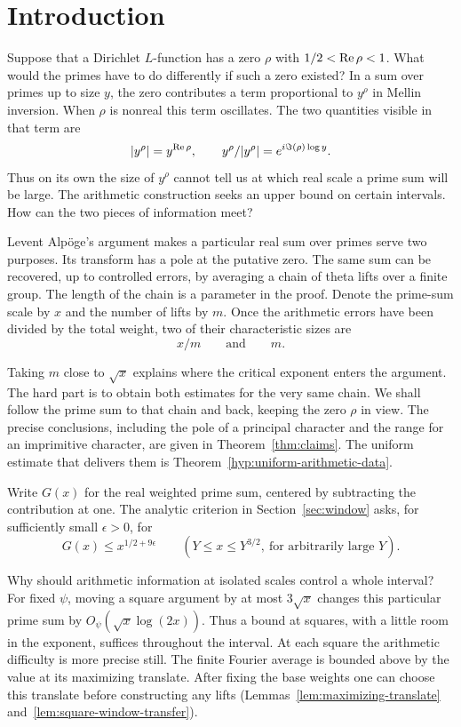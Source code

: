 \section{Introduction}
\label{sec:introduction}

Suppose that a Dirichlet \(L\)-function has a zero \(\rho\) with
\(1/2<\operatorname{Re}\rho<1\). What would the primes have to do differently if such a zero existed?
In a sum over primes up to size \(y\), the zero contributes a term
proportional to \(y^\rho\) in Mellin inversion. When \(\rho\) is nonreal
this term oscillates. The two quantities visible in that term are
\[
         |y^\rho|=y^{\operatorname{Re}\rho},\qquad
         y^\rho/|y^\rho|=e^{i\Im(\rho)\log y}.
\]
Thus on its own the size of \(y^\rho\) cannot tell us at which real scale a prime sum
will be large. The arithmetic construction seeks an upper bound on certain intervals. How can the two pieces of information meet?

Levent Alp\"oge's argument makes a particular real sum over primes serve
two purposes. Its transform has a pole at the putative zero. The same
sum can be recovered, up to controlled errors, by averaging a chain of
theta lifts over a finite group. The length of the chain is a parameter
in the proof. Denote the prime-sum scale by \(x\) and the number of lifts
by \(m\). Once the arithmetic errors have been divided by the total
weight, two of their characteristic sizes are
\[
                         x/m \qquad\text{and}\qquad m .
\]

Taking \(m\) close to \(\sqrt{x}\) explains where the critical exponent enters the argument. The hard part is to obtain both estimates for the
very same chain. We shall follow the prime sum to that chain and back,
keeping the zero \(\rho\) in view. The precise conclusions, including
the pole of a principal character and the range for an imprimitive
character, are given in Theorem~\ref{thm:claims}. The uniform estimate that delivers them is Theorem~\ref{hyp:uniform-arithmetic-data}. \cite{alpoge}

Write \(G(x)\) for the real weighted prime sum, centered by subtracting the contribution at one. The analytic criterion in Section~\ref{sec:window} asks, for sufficiently small \(\epsilon>0\), for
\[
 G(x)\le x^{1/2+9\epsilon}\qquad
        (Y\le x\le Y^{3/2},\ \text{for arbitrarily large }Y).
\]

Why should arithmetic information at isolated scales control a whole
interval? For fixed \(\psi\), moving a square argument by at most
\(3\sqrt{x}\) changes this particular prime sum by
\(O_\psi(\sqrt{x}\log(2x))\). Thus a bound at squares, with a little room
in the exponent, suffices throughout the interval. At each square the
arithmetic difficulty is more precise still. The finite Fourier average
is bounded above by the value at its maximizing translate. After fixing
the base weights one can choose this translate before constructing any
lifts (Lemmas~\ref{lem:maximizing-translate} and~\ref{lem:square-window-transfer}).

